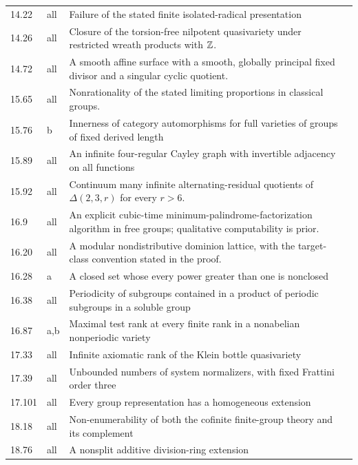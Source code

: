 \begin{longtable}{@{}p{}p{}>{\raggedright\arraybackslash}p{}r@{}}
14.22 & all & Failure of the stated finite isolated-radical presentation & \pageref{cand:14.22} \\
14.26 & all & Closure of the torsion-free nilpotent quasivariety under restricted wreath products with $\mathbb Z$. & \pageref{cand:14.26} \\
14.72 & all & A smooth affine surface with a smooth, globally principal fixed divisor and a singular cyclic quotient. & \pageref{cand:14.72} \\
15.65 & all & Nonrationality of the stated limiting proportions in classical groups. & \pageref{cand:15.65} \\
15.76 & b & Innerness of category automorphisms for full varieties of groups of fixed derived length & \pageref{cand:15.76} \\
15.89 & all & An infinite four-regular Cayley graph with invertible adjacency on all functions & \pageref{cand:15.89} \\
15.92 & all & Continuum many infinite alternating-residual quotients of $\Delta(2,3,r)$ for every $r>6$. & \pageref{cand:15.92} \\
16.9 & all & An explicit cubic-time minimum-palindrome-factorization algorithm in free groups; qualitative computability is prior. & \pageref{cand:16.9} \\
16.20 & all & A modular nondistributive dominion lattice, with the target-class convention stated in the proof. & \pageref{cand:16.20} \\
16.28 & a & A closed set whose every power greater than one is nonclosed & \pageref{cand:16.28} \\
16.38 & all & Periodicity of subgroups contained in a product of periodic subgroups in a soluble group & \pageref{cand:16.38} \\
16.87 & a,b & Maximal test rank at every finite rank in a nonabelian nonperiodic variety & \pageref{cand:16.87} \\
17.33 & all & Infinite axiomatic rank of the Klein bottle quasivariety & \pageref{cand:17.33} \\
17.39 & all & Unbounded numbers of system normalizers, with fixed Frattini order three & \pageref{cand:17.39} \\
17.101 & all & Every group representation has a homogeneous extension & \pageref{cand:17.101} \\
18.18 & all & Non-enumerability of both the cofinite finite-group theory and its complement & \pageref{cand:18.18} \\
18.76 & all & A nonsplit additive division-ring extension & \pageref{cand:18.76} \\

\end{longtable}
